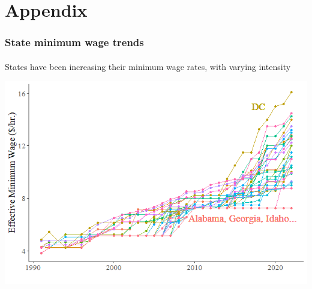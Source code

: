 
\section{Appendix}

\begin{frame}

    \label{min_wage_plot_allstates}
    
    \frametitle{State minimum wage trends} %
    \framesubtitle{}  %
    \rmfamily %
    
    \begin{wideitemize}
        \item States have been increasing their \textcolor{fblu}{minimum wage rates}, with varying intensity
    \end{wideitemize}

    \begin{center}
        \includegraphics[scale=0.5]{min_wage_plot.png}
    \end{center}
    
    \hyperlink{Minimum Wage}{}
    
\end{frame}
